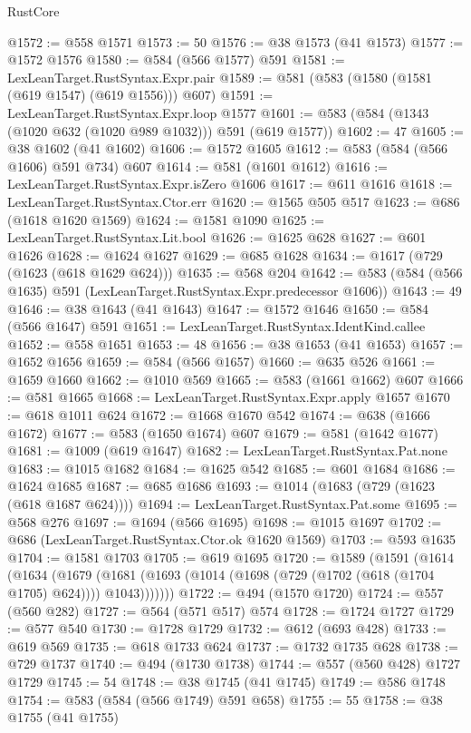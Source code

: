 \begin{lexlean}{RustCore}
\begin{coremodule}
@1572 := @558 @1571
@1573 := 50
@1576 := @38 @1573 (@41 @1573)
@1577 := @1572 @1576
@1580 := @584 (@566 @1577) @591
@1581 := LexLeanTarget.RustSyntax.Expr.pair
@1589 := @581 (@583 (@1580 (@1581 (@619 @1547) (@619 @1556))) @607)
@1591 := LexLeanTarget.RustSyntax.Expr.loop @1577
@1601 := @583 (@584 (@1343 (@1020 @632 (@1020 @989 @1032))) @591 (@619 @1577))
@1602 := 47
@1605 := @38 @1602 (@41 @1602)
@1606 := @1572 @1605
@1612 := @583 (@584 (@566 @1606) @591 @734) @607
@1614 := @581 (@1601 @1612)
@1616 := LexLeanTarget.RustSyntax.Expr.isZero @1606
@1617 := @611 @1616
@1618 := LexLeanTarget.RustSyntax.Ctor.err
@1620 := @1565 @505 @517
@1623 := @686 (@1618 @1620 @1569)
@1624 := @1581 @1090
@1625 := LexLeanTarget.RustSyntax.Lit.bool
@1626 := @1625 @628
@1627 := @601 @1626
@1628 := @1624 @1627
@1629 := @685 @1628
@1634 := @1617 (@729 (@1623 (@618 @1629 @624)))
@1635 := @568 @204
@1642 := @583 (@584 (@566 @1635) @591 (LexLeanTarget.RustSyntax.Expr.predecessor @1606))
@1643 := 49
@1646 := @38 @1643 (@41 @1643)
@1647 := @1572 @1646
@1650 := @584 (@566 @1647) @591
@1651 := LexLeanTarget.RustSyntax.IdentKind.callee
@1652 := @558 @1651
@1653 := 48
@1656 := @38 @1653 (@41 @1653)
@1657 := @1652 @1656
@1659 := @584 (@566 @1657)
@1660 := @635 @526
@1661 := @1659 @1660
@1662 := @1010 @569
@1665 := @583 (@1661 @1662) @607
@1666 := @581 @1665
@1668 := LexLeanTarget.RustSyntax.Expr.apply @1657
@1670 := @618 @1011 @624
@1672 := @1668 @1670 @542
@1674 := @638 (@1666 @1672)
@1677 := @583 (@1650 @1674) @607
@1679 := @581 (@1642 @1677)
@1681 := @1009 (@619 @1647)
@1682 := LexLeanTarget.RustSyntax.Pat.none
@1683 := @1015 @1682
@1684 := @1625 @542
@1685 := @601 @1684
@1686 := @1624 @1685
@1687 := @685 @1686
@1693 := @1014 (@1683 (@729 (@1623 (@618 @1687 @624))))
@1694 := LexLeanTarget.RustSyntax.Pat.some
@1695 := @568 @276
@1697 := @1694 (@566 @1695)
@1698 := @1015 @1697
@1702 := @686 (LexLeanTarget.RustSyntax.Ctor.ok @1620 @1569)
@1703 := @593 @1635
@1704 := @1581 @1703
@1705 := @619 @1695
@1720 := @1589
    (@1591
      (@1614
        (@1634
          (@1679 (@1681 (@1693 (@1014 (@1698 (@729 (@1702 (@618 (@1704 @1705) @624)))) @1043)))))))
@1722 := @494 (@1570 @1720)
@1724 := @557 (@560 @282)
@1727 := @564 (@571 @517) @574
@1728 := @1724 @1727
@1729 := @577 @540
@1730 := @1728 @1729
@1732 := @612 (@693 @428)
@1733 := @619 @569
@1735 := @618 @1733 @624
@1737 := @1732 @1735 @628
@1738 := @729 @1737
@1740 := @494 (@1730 @1738)
@1744 := @557 (@560 @428) @1727 @1729
@1745 := 54
@1748 := @38 @1745 (@41 @1745)
@1749 := @586 @1748
@1754 := @583 (@584 (@566 @1749) @591 @658)
@1755 := 55
@1758 := @38 @1755 (@41 @1755)

\end{coremodule}
\end{lexlean}
